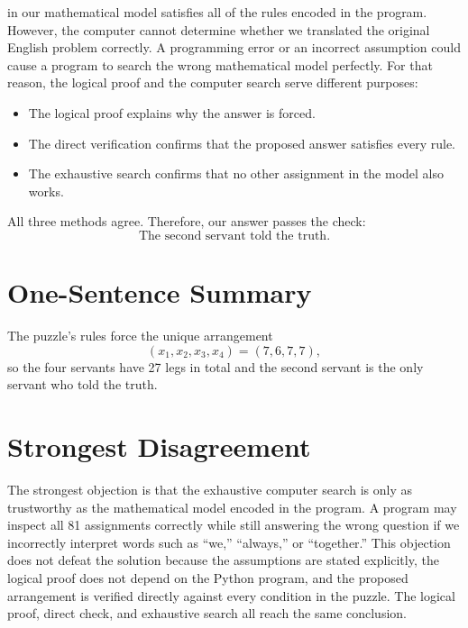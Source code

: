 \documentclass[11pt]{article}
\begin{document}
in our mathematical model satisfies all of the rules encoded in the program. However, the computer cannot determine whether we translated the original English problem correctly. A programming error or an incorrect assumption could cause a program to search the wrong mathematical model perfectly. For that reason, the logical proof and the computer search serve different purposes: \begin{itemize} \item The logical proof explains why the answer is forced. \item The direct verification confirms that the proposed answer satisfies every rule. \item The exhaustive search confirms that no other assignment in the model also works. \end{itemize} All three methods agree. Therefore, our answer passes the check: \[ \boxed{\text{The second servant told the truth.}} \]

\section*{One-Sentence Summary} The puzzle's rules force the unique arrangement \[ (x_1,x_2,x_3,x_4)=(7,6,7,7), \] so the four servants have 27 legs in total and the second servant is the only servant who told the truth.

\section*{Strongest Disagreement} The strongest objection is that the exhaustive computer search is only as trustworthy as the mathematical model encoded in the program. A program may inspect all 81 assignments correctly while still answering the wrong question if we incorrectly interpret words such as ``we,'' ``always,'' or ``together.'' This objection does not defeat the solution because the assumptions are stated explicitly, the logical proof does not depend on the Python program, and the proposed arrangement is verified directly against every condition in the puzzle. The logical proof, direct check, and exhaustive search all reach the same conclusion.
\end{document}
